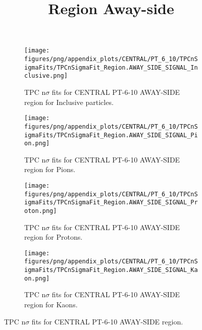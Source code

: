             \begin{figure}[H]
                \title{Region Away-side}
                \begin{subfigure}[b]{0.5\textwidth}
                    \centering
                    \texttt{[image: figures/png/appendix\_plots/CENTRAL/PT\_6\_10/TPCnSigmaFits/TPCnSigmaFit\_Region.AWAY\_SIDE\_SIGNAL\_Inclusive.png]}
                    \caption{TPC n$\sigma$ fits for CENTRAL PT-6-10 AWAY-SIDE region for Inclusive particles.}
                    \label{fig:appendix_CENTRAL_PT-6-10_AWAY_SIDE_SIGNAL_Inclusive}
                \end{subfigure}
                \begin{subfigure}[b]{0.5\textwidth}
                    \centering
                    \texttt{[image: figures/png/appendix\_plots/CENTRAL/PT\_6\_10/TPCnSigmaFits/TPCnSigmaFit\_Region.AWAY\_SIDE\_SIGNAL\_Pion.png]}
                    \caption{TPC n$\sigma$ fits for CENTRAL PT-6-10 AWAY-SIDE region for Pions.}
                    \label{fig:appendix_CENTRAL_PT-6-10_AWAY_SIDE_SIGNAL_Pion}
                \end{subfigure}
                \begin{subfigure}[b]{0.5\textwidth}
                    \centering
                    \texttt{[image: figures/png/appendix\_plots/CENTRAL/PT\_6\_10/TPCnSigmaFits/TPCnSigmaFit\_Region.AWAY\_SIDE\_SIGNAL\_Proton.png]}
                    \caption{TPC n$\sigma$ fits for CENTRAL PT-6-10 AWAY-SIDE region for Protons.}
                    \label{fig:appendix_CENTRAL_PT-6-10_AWAY_SIDE_SIGNAL_Proton}
                \end{subfigure}
                \begin{subfigure}[b]{0.5\textwidth}
                    \centering
                    \texttt{[image: figures/png/appendix\_plots/CENTRAL/PT\_6\_10/TPCnSigmaFits/TPCnSigmaFit\_Region.AWAY\_SIDE\_SIGNAL\_Kaon.png]}
                    \caption{TPC n$\sigma$ fits for CENTRAL PT-6-10 AWAY-SIDE region for Kaons.}
                    \label{fig:appendix_CENTRAL_PT-6-10_AWAY_SIDE_SIGNAL_Kaon}
                \end{subfigure}
                \caption{TPC n$\sigma$ fits for CENTRAL PT-6-10 AWAY-SIDE region.}
                \label{fig:appendix_CENTRAL_PT-6-10_AWAY_SIDE_SIGNAL}
            \end{figure}
